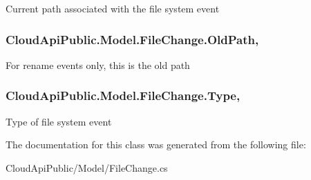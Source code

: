 Current path associated with the file system event 

\hypertarget{class_cloud_api_public_1_1_model_1_1_file_change_a08ced19e1fccebb04bf6da37f21a4216}{
\subsubsection[{Old\-Path}]{ Cloud\-Api\-Public.\-Model.\-File\-Change.\-Old\-Path\hspace{0.3cm}{\ttfamily [get]}, {\ttfamily [set]}}}\label{class_cloud_api_public_1_1_model_1_1_file_change_a08ced19e1fccebb04bf6da37f21a4216}


For rename events only, this is the old path 

\hypertarget{class_cloud_api_public_1_1_model_1_1_file_change_a6a1aeec98ba00f051497c5126adf69a4}{
\subsubsection[{Type}]{ Cloud\-Api\-Public.\-Model.\-File\-Change.\-Type\hspace{0.3cm}{\ttfamily [get]}, {\ttfamily [set]}}}\label{class_cloud_api_public_1_1_model_1_1_file_change_a6a1aeec98ba00f051497c5126adf69a4}


Type of file system event 



The documentation for this class was generated from the following file\-:\begin{DoxyCompactItemize}
\item 
Cloud\-Api\-Public/\-Model/File\-Change.\-cs\end{DoxyCompactItemize}
